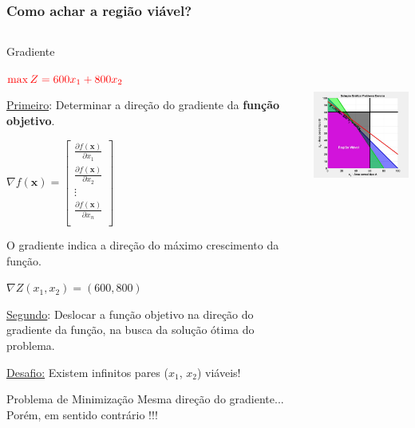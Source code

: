\documentclass{beamer}
\begin{document}
\begin{frame}	
	\frametitle{Como achar a região viável?}
	\begin{columns}
		\begin{column}{0.5\textwidth}
			\begin{exampleblock}{Gradiente}
				\begin{itemize}
					 {\item[] $ \color{red}\max Z = 600x_1 + 800x_2$}
					 {\item[] \underline{Primeiro}: Determinar a direção do gradiente da \textbf{função objetivo}.}
					 {\item[] $ \nabla f(\mathbf{x}) = \begin{bmatrix}
																\frac{\partial f(\mathbf{x})}{\partial x_1} \\
																\frac{\partial f(\mathbf{x})}{\partial x_2} \\
																\vdots \\
																\frac{\partial f(\mathbf{x})}{\partial x_n} \\
															\end{bmatrix} $}
					 {\item[] O gradiente indica a direção do máximo crescimento da função.}
					 {\item[] $\nabla Z(x_1,x_2) = (600,800)$}
					 {\item[] \underline{Segundo}: {\color{red}Deslocar a função objetivo} na direção do gradiente da função, na busca da solução ótima do problema.}
					 {\item[] \color{red} \underline{Desafio:} Existem infinitos pares ($x_1$, $x_2$) viáveis!} 
				\end{itemize}
			\end{exampleblock}
			{
				\begin{alertblock}{Problema de Minimização}
					Mesma direção do gradiente... Porém, em sentido contrário !!!
				\end{alertblock}
			}
		\end{column}
		\begin{column}{0.5\textwidth}
			\centering
			\only<1-3> {\includegraphics[width=6cm,height=6cm]{MatLab/anima_18.png} }

\end{column}
\end{columns}
\end{frame}
\end{document}

